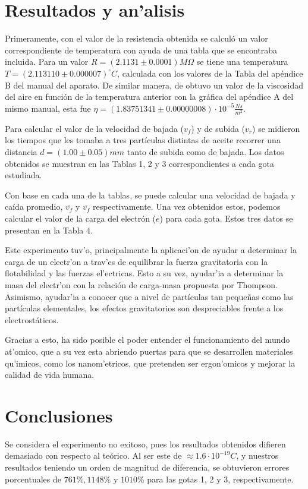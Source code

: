 \documentclass{article}
\begin{document}
\begin{multicols}{2}
\section*{Resultados y an'alisis}\label{Resultados}
Primeramente, con el valor de la resistencia obtenida se calculó un valor correspondiente de temperatura con ayuda de una tabla que se encontraba incluida. Para un valor $R= (2.1131 \pm 0.0001)M\Omega$ se tiene una temperatura $T=(2.113110 \pm 0.000007)^{\circ}C$, calculada con los valores de la Tabla del apéndice B del manual del aparato. De similar manera, de obtuvo un valor de la viscosidad del aire en función de la temperatura anterior con la gráfica del apéndice A del mismo manual, esta fue
$\eta=(1.83751341\pm0.00000008)\cdot10^{-5}\frac{Ns}{m^2}.$

Para calcular el valor de la velocidad de bajada ($v_f$) y de subida ($v_r$) se midieron los tiempos que les tomaba a tres partículas distintas de aceite recorrer una distancia $d=(1.00\pm0.05)mm$ tanto de subida como de bajada. Los datos obtenidos se muestran en las Tablas 1, 2 y 3 correspondientes a cada gota estudiada.



Con base en cada una de la tablas, se puede calcular una velocidad de bajada y caída promedio, $\overline{v_f}$ y $\overline{v_f}$ respectivamente. Una vez obtenidos estos, podemos calcular el valor de la carga del electrón ($e$) para cada gota.
Estos tres datos se presentan en la Tabla 4.


Este experimento tuv'o, principalmente la aplicaci'on de ayudar a determinar la carga de un electr'on a trav'es de equilibrar la fuerza gravitatoria con la flotabilidad y las fuerzas el'ectricas. Esto a su vez, ayudar'ia a determinar la masa del electr'on con la relación de carga-masa propuesta por Thompson. Asimismo, ayudar'ia a conocer que a nivel de partículas tan pequeñas como las partículas elementales, los efectos gravitatorios son despreciables frente a los electrostáticos. 

Gracias a esto, ha sido posible el poder entender el funcionamiento del mundo at'omico, que a su vez esta abriendo puertas para que se desarrollen materiales qu'imicos, como los nanom'etricos, que pretenden ser ergon'omicos y mejorar la calidad de vida humana. 

\section*{Conclusiones}\label{Conclusiones}			Se considera el experimento no exitoso, pues los resultados obtenidos difieren demasiado con respecto al teórico. Al ser este de $\approx 1.6\cdot10^{-19}C$, y nuestros resultados teniendo un orden de magnitud de diferencia, se obtuvieron errores porcentuales de $761\%,1148\%$ y $1010\%$ para las gotas 1, 2 y 3, respectivamente.


\end{multicols}
\end{document}
